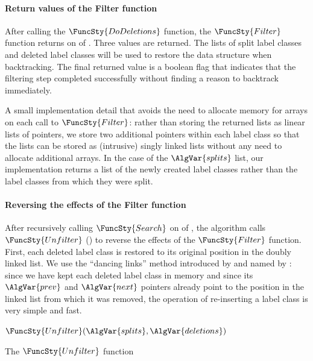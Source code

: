 \paragraph{Return values of the Filter function}
After calling the $\FuncSty{DoDeletions}$ function,
the $\FuncSty{Filter}$ function returns on  
of .  Three values are returned. The lists
of split label classes and deleted label classes will be used to restore
the data structure when backtracking. The final returned value is a boolean
flag that indicates that the filtering step completed successfully
without finding a reason to backtrack immediately.

A small implementation detail that avoids the need to allocate
memory for arrays on each call to $\FuncSty{Filter}$: rather than storing the returned lists
as linear lists of pointers, we store two additional pointers within
each label class so that the lists can be stored as (intrusive) singly linked
lists without any need to allocate additional arrays.  In the case of the
$\AlgVar{splits}$ list, our implementation returns a list of the newly created
label classes rather than the label classes from which they were split.

\paragraph{Reversing the effects of the Filter function}
After recursively calling $\FuncSty{Search}$ on 
of , the algorithm calls $\FuncSty{Unfilter}$
() to reverse the effects of the $\FuncSty{Filter}$
function.  
First, each deleted label class is restored to its
original position in the doubly linked list.  We use the ``dancing links'' method
introduced by \citet{DBLP:journals/ipl/HitotumatuN79} and named by
\citet{knuth2020art}: since we have kept each deleted label class
in memory and since its $\AlgVar{prev}$ and $\AlgVar{next}$ pointers
already point to the position in the linked list from which it was removed,
the operation of re-inserting a label class is very simple and fast.

\begin{algorithm}[htb]
\AlgorithmFontSize
\DontPrintSemicolon
\nl $\FuncSty{Unfilter}(\AlgVar{splits}, \AlgVar{deletions})$ \;
\nl {}
\caption{The $\FuncSty{Unfilter}$ function}
\label{McSplitSIAlgUnfilter}
\end{algorithm}

